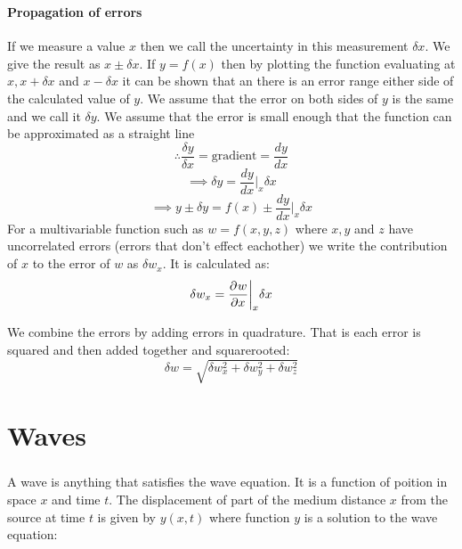 \section{}

\subsection*{Propagation of errors}

If we measure a value \(x\) then we call the uncertainty in this measurement \(\delta x\). We give the result as \(x\pm\delta x\). If \(y=f(x)\) then by plotting the function evaluating at \(x,x+\delta x\) and \(x-\delta x\) it can be shown that an there is an error range either side of the calculated value of \(y\). We assume that the error on both sides of \(y\) is the same and we call it \(\delta y\). We assume that the error is small enough that the function can be approximated as a straight line
\[\therefore \frac{\delta y}{\delta x}=\text{gradient}=\frac{dy}{dx}\]
\[\implies\delta y=\frac{dy}{dx}\biggr|_x\delta x\]
\[\implies y\pm\delta y=f(x)\pm\frac{dy}{dx}\biggr|_x\delta x\]
For a multivariable function such as \(w=f(x,y,z)\) where \(x,y\) and \(z\) have uncorrelated errors (errors that don't effect eachother) we write the contribution of \(x\) to the error of \(w\) as \(\delta w_x\). It is calculated as:
\[\delta w_x=\frac{\partial^{}{w}}{\partial{x}^{}}\biggr|_x\delta x\]

We combine the errors by adding errors in quadrature. That is each error is squared and then added together and squarerooted:
\[\delta w=\sqrt{\delta w_x^2+\delta w_y^2+\delta w_z^2}\]

\part{Waves}
\section{}

A wave is anything that satisfies the wave equation. It is a function of poition in space \(x\) and time \(t\). The displacement of part of the medium distance \(x\) from the source at time \(t\) is given by \(y(x,t)\) where function \(y\) is a solution to the wave equation:
\begin{center}
\end{center}

